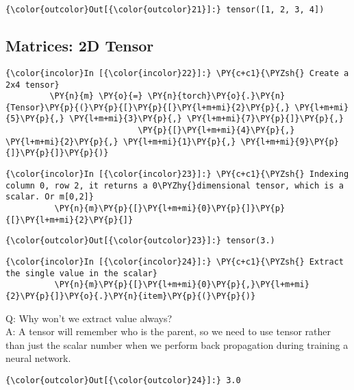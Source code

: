 \begin{Verbatim}[commandchars=\\\{\}]
{\color{outcolor}Out[{\color{outcolor}21}]:} tensor([1, 2, 3, 4])
\end{Verbatim}
\subsection{Matrices: 2D Tensor}
\begin{Verbatim}[commandchars=\\\{\}]
{\color{incolor}In [{\color{incolor}22}]:} \PY{c+c1}{\PYZsh{} Create a 2x4 tensor}
         \PY{n}{m} \PY{o}{=} \PY{n}{torch}\PY{o}{.}\PY{n}{Tensor}\PY{p}{(}\PY{p}{[}\PY{p}{[}\PY{l+m+mi}{2}\PY{p}{,} \PY{l+m+mi}{5}\PY{p}{,} \PY{l+m+mi}{3}\PY{p}{,} \PY{l+m+mi}{7}\PY{p}{]}\PY{p}{,}
                           \PY{p}{[}\PY{l+m+mi}{4}\PY{p}{,} \PY{l+m+mi}{2}\PY{p}{,} \PY{l+m+mi}{1}\PY{p}{,} \PY{l+m+mi}{9}\PY{p}{]}\PY{p}{]}\PY{p}{)} 
\end{Verbatim}
            
\begin{Verbatim}[commandchars=\\\{\}]
{\color{incolor}In [{\color{incolor}23}]:} \PY{c+c1}{\PYZsh{} Indexing column 0, row 2, it returns a 0\PYZhy{}dimensional tensor, which is a scalar. Or m[0,2]}
          \PY{n}{m}\PY{p}{[}\PY{l+m+mi}{0}\PY{p}{]}\PY{p}{[}\PY{l+m+mi}{2}\PY{p}{]} 
\end{Verbatim}


\begin{Verbatim}[commandchars=\\\{\}]
{\color{outcolor}Out[{\color{outcolor}23}]:} tensor(3.)
\end{Verbatim}
            
\begin{Verbatim}[commandchars=\\\{\}]
{\color{incolor}In [{\color{incolor}24}]:} \PY{c+c1}{\PYZsh{} Extract the single value in the scalar}
          \PY{n}{m}\PY{p}{[}\PY{l+m+mi}{0}\PY{p}{,}\PY{l+m+mi}{2}\PY{p}{]}\PY{o}{.}\PY{n}{item}\PY{p}{(}\PY{p}{)} 
\end{Verbatim}
Q: Why won't we extract value always? \\
A: A tensor will remember who is the parent, so we need to use tensor rather than just the scalar number when we perform back propagation during training a neural network.

\begin{Verbatim}[commandchars=\\\{\}]
{\color{outcolor}Out[{\color{outcolor}24}]:} 3.0
\end{Verbatim}
            
